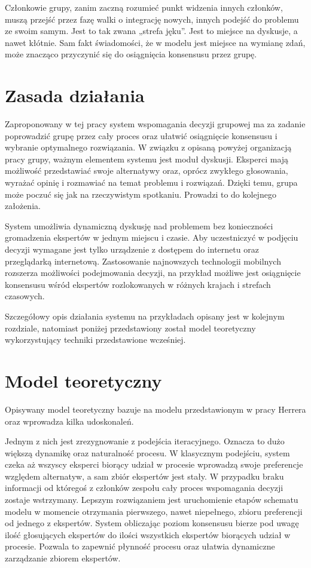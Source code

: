 Członkowie grupy, zanim zaczną rozumieć punkt widzenia innych członków, muszą 
przejść przez fazę walki o integrację nowych, innych podejść do problemu ze 
swoim samym. Jest to tak zwana „strefa jęku”. Jest to miejsce na dyskusje, a 
nawet kłótnie. Sam fakt świadomości, że w modelu jest miejsce na wymianę zdań, 
może znacząco przyczynić się do osiągnięcia konsensusu przez grupę.

\section{Zasada działania}
Zaproponowany w tej pracy system wspomagania decyzji grupowej ma za zadanie
poprowadzić grupę przez cały proces oraz ułatwić osiągnięcie konsensusu i
wybranie optymalnego rozwiązania. W związku z opisaną powyżej organizacją pracy
grupy, ważnym elementem systemu jest moduł dyskusji. Eksperci mają możliwość
przedstawiać swoje alternatywy oraz, oprócz zwykłego głosowania, wyrażać opinię
i rozmawiać na temat problemu i rozwiązań. Dzięki temu, grupa może poczuć się
jak na rzeczywistym spotkaniu. Prowadzi to do kolejnego założenia.

System umożliwia dynamiczną dyskusję nad problemem bez konieczności gromadzenia 
ekspertów w jednym miejscu i czasie. Aby uczestniczyć w podjęciu decyzji 
wymagane jest tylko urządzenie z dostępem do internetu oraz przeglądarką 
internetową. Zastosowanie najnowszych technologii mobilnych rozszerza możliwości
podejmowania decyzji, na przykład możliwe jest osiągnięcie konsensusu wśród 
ekspertów rozlokowanych w różnych krajach i strefach czasowych.

Szczegółowy opis działania systemu na przykładach opisany jest w kolejnym 
rozdziale, natomiast poniżej przedstawiony został model teoretyczny 
wykorzystujący techniki przedstawione wcześniej.

\section{Model teoretyczny}
Opisywany model teoretyczny bazuje na modelu przedstawionym w pracy Herrera
 oraz wprowadza kilka udoskonaleń.

Jednym z nich jest zrezygnowanie z podejścia iteracyjnego. Oznacza to dużo
większą dynamikę oraz naturalność procesu. W klasycznym podejściu, system czeka
aż wszyscy eksperci biorący udział w procesie wprowadzą swoje preferencje
względem alternatyw, a sam zbiór ekspertów jest stały. W przypadku braku
informacji od któregoś z członków zespołu cały proces wspomagania decyzji
zostaje wstrzymany. 
Lepszym rozwiązaniem jest uruchomienie etapów schematu modelu w momencie
otrzymania pierwszego, nawet niepełnego, zbioru preferencji od jednego z
ekspertów. System obliczając poziom konsensusu bierze pod uwagę ilość
głosujących ekspertów do ilości wszystkich ekspertów biorących udział w
procesie. Pozwala to zapewnić płynność procesu oraz ułatwia dynamiczne
zarządzanie zbiorem ekspertów.


